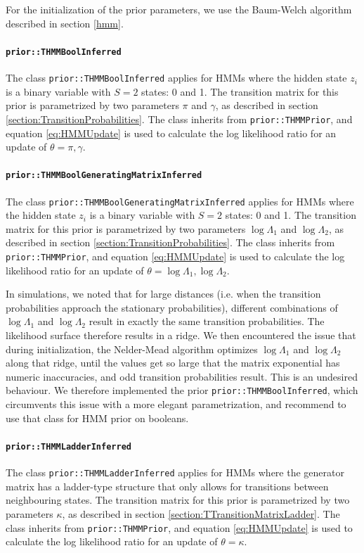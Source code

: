 \documentclass[a4paper,11pt]{article}
\newcommand{\class}[1]{\texttt{#1}}
\begin{document}
For the initialization of the prior parameters, we use the Baum-Welch algorithm described in section \ref{hmm}.

\paragraph{\class{prior::THMMBoolInferred}}
The class \class{prior::THMMBoolInferred} applies for HMMs where the hidden state $z_i$ is a binary variable with $S=2$ states: 0 and 1. The transition matrix for this prior is parametrized by two parameters $\pi$ and $\gamma$, as described in section \ref{section:TransitionProbabilities}. The class inherits from \class{prior::THMMPrior}, and equation \ref{eq:HMMUpdate} is used to calculate the log likelihood ratio for an update of $\theta = \pi, \gamma$.

\paragraph{\class{prior::THMMBoolGeneratingMatrixInferred}}
The class \class{prior::THMMBoolGeneratingMatrixInferred} applies for HMMs where the hidden state $z_i$ is a binary variable with $S=2$ states: 0 and 1. The transition matrix for this prior is parametrized by two parameters $\log \Lambda_1$ and $\log \Lambda_2$, as described in section \ref{section:TransitionProbabilities}. The class inherits from \class{prior::THMMPrior}, and equation \ref{eq:HMMUpdate} is used to calculate the log likelihood ratio for an update of $\theta = \log \Lambda_1, \log \Lambda_2$.

In simulations, we noted that for large distances (i.e. when the transition probabilities approach the stationary probabilities), different combinations of $\log \Lambda_1$ and $\log \Lambda_2$ result in exactly the same transition probabilities. The likelihood surface therefore results in a ridge. We then encountered the issue that during initialization, the Nelder-Mead algorithm optimizes $\log \Lambda_1$ and $\log \Lambda_2$ along that ridge, until the values get so large that the matrix exponential has numeric inaccuracies, and odd transition probabilities result. This is an undesired behaviour. We therefore implemented the prior \class{prior::THMMBoolInferred}, which circumvents this issue with a more elegant parametrization, and recommend to use that class for HMM prior on booleans.

\paragraph{\class{prior::THMMLadderInferred}}
The class \class{prior::THMMLadderInferred} applies for HMMs where the generator matrix has a ladder-type structure that only allows for transitions between neighbouring states. The transition matrix for this prior is parametrized by two parameters $\kappa$, as described in section \ref{section:TTransitionMatrixLadder}. The class inherits from \class{prior::THMMPrior}, and equation \ref{eq:HMMUpdate} is used to calculate the log likelihood ratio for an update of $\theta = \kappa$.
\end{document}
